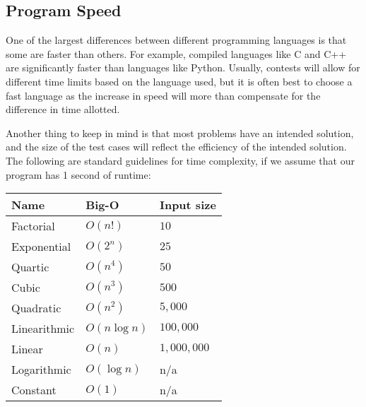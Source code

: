 \subsection{Program Speed}

One of the largest differences between different programming languages is that some are faster than others.  For example, compiled languages like C and C++ are significantly faster than languages like Python.  Usually, contests will allow for different time limits based on the language used, but it is often best to choose a fast language as the increase in speed will more than compensate for the difference in time allotted.

Another thing to keep in mind is that most problems have an intended solution, and the size of the test cases will reflect the efficiency of the intended solution.  The following are standard guidelines for time complexity, if we assume that our program has 1 second of runtime:


\begin{center}
\begin{tabular}{| l | l | l |}
  \hline
  \textbf{Name} & \textbf{Big-O} & \textbf{Input size}  \\ \hline
  Factorial    & $ O(n!) $      & $ 10 $ \\ \hline
  Exponential  & $ O(2^n) $     & $ 25 $ \\ \hline
  Quartic      & $ O(n^4) $     & $ 50 $ \\ \hline
  Cubic        & $ O(n^3) $     & $ 500 $ \\ \hline
  Quadratic    & $ O(n^2) $     & $ 5,000 $ \\ \hline
  Linearithmic & $ O(n\log n) $ & $ 100,000 $ \\ \hline
  Linear       & $ O(n) $       & $ 1,000,000 $ \\ \hline
  Logarithmic  & $ O(\log n) $  & n/a\footnotemark[1] \\ \hline
  Constant     & $ O(1) $       & n/a\footnotemark[1] \\ \hline
\end{tabular}
\end{center}


